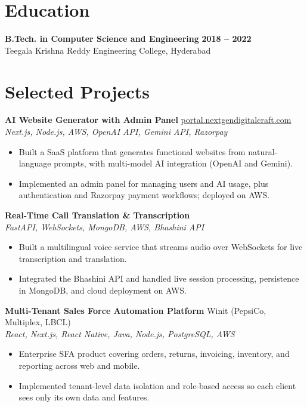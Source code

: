 \documentclass[a4paper,11pt]{article}
\newcommand{\project}[3]{%
  \textbf{#1} \hfill {\small #2}\\[-1pt]
  {\small \textit{#3}}\par\vspace{1pt}}
\begin{document}
\section*{Education}
\textbf{B.Tech. in Computer Science and Engineering} \hfill \textbf{2018 -- 2022}\\[-1pt]
Teegala Krishna Reddy Engineering College, Hyderabad

\newpage

\section*{Selected Projects}

\project{AI Website Generator with Admin Panel}{\href{https://portal.nextgendigitalcraft.com/}{portal.nextgendigitalcraft.com}}{Next.js, Node.js, AWS, OpenAI API, Gemini API, Razorpay}
\begin{itemize}
  \item Built a SaaS platform that generates functional websites from natural-language prompts, with multi-model AI integration (OpenAI and Gemini).
  \item Implemented an admin panel for managing users and AI usage, plus authentication and Razorpay payment workflows; deployed on AWS.
\end{itemize}

\project{Real-Time Call Translation \& Transcription}{}{FastAPI, WebSockets, MongoDB, AWS, Bhashini API}
\begin{itemize}
  \item Built a multilingual voice service that streams audio over WebSockets for live transcription and translation.
  \item Integrated the Bhashini API and handled live session processing, persistence in MongoDB, and cloud deployment on AWS.
\end{itemize}

\project{Multi-Tenant Sales Force Automation Platform}{Winit (PepsiCo, Multiplex, LBCL)}{React, Next.js, React Native, Java, Node.js, PostgreSQL, AWS}
\begin{itemize}
  \item Enterprise SFA product covering orders, returns, invoicing, inventory, and reporting across web and mobile.
  \item Implemented tenant-level data isolation and role-based access so each client sees only its own data and features.
\end{itemize}
\end{document}
